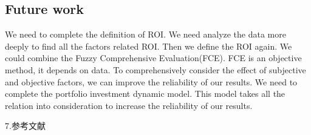 \subsection{Future work }
We need to complete the definition of ROI. We need analyze the data more deeply to find all the factors related ROI. Then we define the ROI again.
We could combine the Fuzzy Comprehensive Evaluation(FCE). FCE is an objective method, it depends on data. To comprehensively consider the effect of subjective and objective factors, we can improve the reliability of our results.
We need to complete the portfolio investment dynamic model. This model takes all the relation into consideration to increase the reliability of our results. 

7.参考文献
